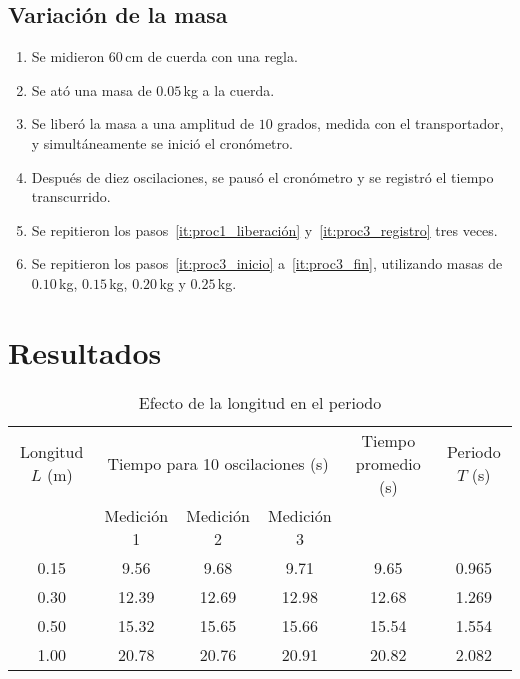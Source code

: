\documentclass[twocolumn]{report}
\numberwithin{table}{section}
\begin{document}
\subsection{Variación de la masa}

\begin{enumerate}
  \item Se midieron 60\,cm de cuerda con una regla.\label{it:proc3_inicio}
  \item Se ató una masa de $0.05$\,kg a la cuerda.
  \item Se liberó la masa a una amplitud de $10$ grados, medida con
    el transportador, y simultáneamente se inició el
    cronómetro.
  \item Después de diez oscilaciones, se pausó el cronómetro y se
    registró el tiempo transcurrido.\label{it:proc3_registro}
  \item Se repitieron los pasos~\ref{it:proc1_liberación}
    y~\ref{it:proc3_registro} tres veces.\label{it:proc3_fin}
  \item Se repitieron los pasos~\ref{it:proc3_inicio}
    a~\ref{it:proc3_fin}, utilizando masas de
    $0.10$\,kg, $0.15$\,kg, $0.20$\,kg y $0.25$\,kg.
\end{enumerate}

\newpage
\onecolumn
\section{Resultados}

\begin{table}[ht]
  \centering
  \begin{tabular}{cccccc}
    \toprule
    Longitud $L$ (m) & \multicolumn{3}{c}{Tiempo para 10
    oscilaciones (s)} & Tiempo promedio (s) & Periodo $T$ (s) \\
    \cmidrule(lr){2-4}
    & Medición 1 & Medición 2 & Medición 3 &  &  \\
    \midrule
    0.15 &  9.56 &  9.68 &  9.71 &  9.65 & 0.965 \\
    0.30 & 12.39 & 12.69 & 12.98 & 12.68 & 1.269 \\
    0.50 & 15.32 & 15.65 & 15.66 & 15.54 & 1.554 \\
    1.00 & 20.78 & 20.76 & 20.91 & 20.82 & 2.082 \\
    \bottomrule
  \end{tabular}
  \caption{Efecto de la longitud en el periodo}\label{tab:longitud_periodo}
\end{table}
\end{document}
